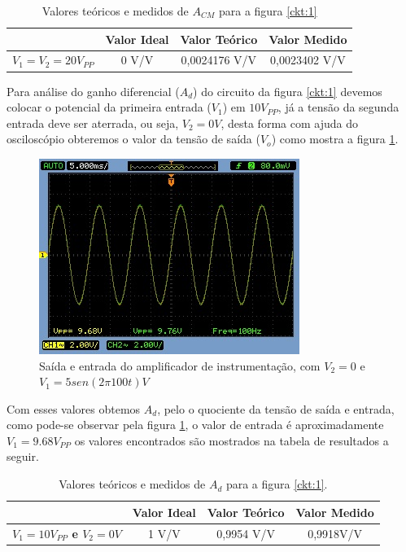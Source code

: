 \begin{table}[H]
\centering
\begin{tabular}{c|c|c|c|}
\cline{2-4}
\textbf{} & \textbf{Valor Ideal} & \textbf{Valor Teórico} & \textbf{Valor Medido} \\ \hline
\multicolumn{1}{|c|}{\textbf{$V_1 = V_2  =  20 V_{PP}$}} & 0 V/V & 0,0024176 V/V & 0,0023402 V/V \\ \hline
\end{tabular}
\caption{Valores teóricos e medidos de $A_{CM}$ para a figura \ref{ckt:1}}
\label{tab:2}
\end{table}


Para análise do ganho diferencial ($A_d$) do circuito da figura \ref{ckt:1} devemos colocar o potencial da primeira entrada ($V_1$) em $10V_{PP}$, já a tensão da segunda entrada deve ser aterrada, ou seja, $V_2 = 0V$, desta forma com ajuda do osciloscópio obteremos o valor da tensão de saída ($V_o$) como mostra a figura \ref{p2-out}.

\begin{figure}[H] 
\centering
\includegraphics[scale=0.7]{imagens/AD1_CH12.jpg} 
\caption{Saída e entrada do amplificador de instrumentação, com $V_2=0$ e $V_1=5 sen(2\pi100t)V$}
\label{p2-out} 
\end{figure}

Com esses valores obtemos $A_d$, pelo o quociente da tensão de saída e entrada, como pode-se observar pela figura \ref{p2-out}, o valor de entrada é aproximadamente $V_1 = 9.68 V_{PP}$ os valores encontrados são mostrados na tabela de resultados a seguir.


\begin{table}[H]
\centering
\begin{tabular}{c|c|c|c|}
\cline{2-4}
\textbf{} & \textbf{Valor Ideal} & \textbf{Valor Teórico} & \textbf{Valor Medido} \\ \hline
\multicolumn{1}{|c|}{\textbf{$V_1 = 10 V_{PP}$ e $V_2 = 0V$ }} & 1 V/V & 0,9954 V/V & 0,9918V/V \\ \hline
\end{tabular}
\caption{Valores teóricos e medidos de $A_{d}$ para a figura \ref{ckt:1}.}
\label{tab:3}
\end{table}

